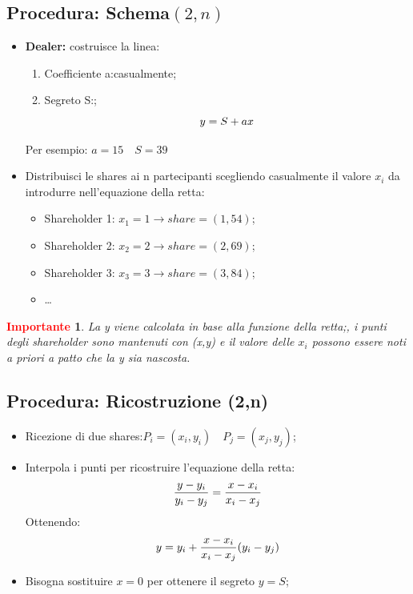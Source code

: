 \documentclass{book}
\newtheorem*{Importante}{\textbf{\textcolor{red}{Importante}}}
\begin{document}
\subsection{Procedura: Schema\((2,n)\)}
\begin{itemize}
    \item \textbf{Dealer:} costruisce la linea:
          \begin{enumerate}
              \item Coefficiente a:\@scelto casualmente;
              \item Segreto S:\@noto;
                    \begin{equation*}
                        \centering
                        y=S+ax
                    \end{equation*}
          \end{enumerate}
          Per esempio: \(a=15\quad S=39\)
    \item Distribuisci le shares ai n partecipanti scegliendo casualmente il valore \(x_{i}\) da introdurre nell'equazione della retta:
          \begin{itemize}
              \item Shareholder 1: \(x_{1}=1\rightarrow share=(1,54)\);
              \item Shareholder 2: \(x_{2}=2\rightarrow share=(2,69)\);
              \item Shareholder 3: \(x_{3}=3\rightarrow share=(3,84)\);
              \item \dots
          \end{itemize}
\end{itemize}
\begin{Importante}
    La y viene calcolata in base alla funzione della retta;\@tuttavia, i punti degli shareholder sono mantenuti con (x,y) e il valore delle \(x_{i}\) possono essere noti a priori a patto che la y sia nascosta\@.
\end{Importante}
\subsection{Procedura: Ricostruzione (2,n)}
\begin{itemize}
    \item Ricezione di due shares:\(P_{i}=(x_{i},y_{i})\quad P_{j}=(x_{j},y_{j})\);
    \item Interpola i punti per ricostruire l'equazione della retta:
          \begin{equation*}
              \centering
              \frac{y-y_{i}}{y_{i}-y_{j}}=\frac{x-x_{i}}{x_{i}-x_{j}}
          \end{equation*}
          Ottenendo:
          \begin{equation*}
              \centering
              y=y_{i}+\frac{x-x_{i}}{x_{i}-x_{j}}(y_{i}-y_{j})
          \end{equation*}
    \item Bisogna sostituire \(x=0\) per ottenere il segreto \(y=S\);
\end{itemize}
\end{document}

